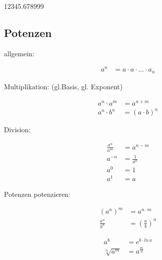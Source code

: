 
\num{12345,678999}


\subsection{Potenzen }\label{sec:potenzen }

allgemein:

\begin{align}
a^n &= a \cdot a \cdot ... \cdot a_n
\end{align}

Multiplikation: (gl.Basis, gl. Exponent)

\begin{align}
a^n \cdot a^m &= a^{n+m} \\
a^n \cdot b^n &= (a \cdot b)^n
\end{align}

Division:

\begin{align}
\frac{a^n}{a^m} &= a^{n-m} \\
a^{-n}          &= \frac{1}{a^n}   \\
a^0 						&= 1 \\
a^1				      &= a
\end{align}

Potenzen potenzieren:

\begin{align}
(a^n)^m         &= a^{n \cdot m} \\
\frac{a^n}{b^n} &= \left(\frac{a}{b}\right)^n
\end{align}

\begin{align}
a^b        &= e^{b \cdot ln \, a} \\
\sqrt[n]{a^m} &= a^{\frac{m}{n}}
\end{align}

